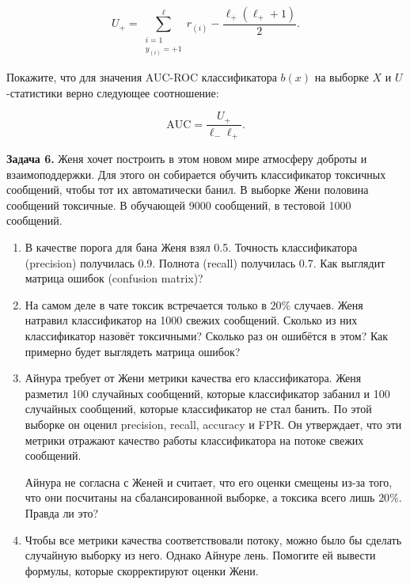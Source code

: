 \documentclass[12pt,fleqn]{article}
\begin{document}
$$
U_{+}=\sum_{\substack{i=1 \\ y_{(i)}=+1}}^{\ell} r_{(i)}-\frac{\ell_{+}\left(\ell_{+}+1\right)}{2}.
$$

Покажите, что для значения AUC-ROC классификатора $b(x)$ на выборке $X$ и $U$-статистики верно следующее соотношение:

$$
\mathrm{AUC}=\frac{U_{+}}{\ell_{-} \ell_{+}}.
$$

\textbf{Задача 6.} Женя хочет построить в этом новом мире атмосферу доброты и взаимоподдержки. Для этого он собирается обучить классификатор токсичных сообщений, чтобы тот их автоматически банил. В выборке Жени половина сообщений токсичные. В обучающей 9000 сообщений, в тестовой 1000 сообщений.

\begin{enumerate}
  \item В качестве порога для бана Женя взял 0.5. Точность классификатора (precision) получилась 0.9. Полнота (recall) получилась 0.7. Как выглядит матрица ошибок (confusion matrix)?
  \item На самом деле в чате токсик встречается только в $20 \%$ случаев. Женя натравил классификатор на 1000 свежих сообщений. Сколько из них классификатор назовёт токсичными? Сколько раз он ошибётся в этом? Как примерно будет выглядеть матрица ошибок?\\
  \item Айнура требует от Жени метрики качества его классификатора. Женя разметил 100 случайных сообщений, которые классификатор забанил и 100 случайных сообщений, которые классификатор не стал банить. По этой выборке он оценил precision, recall, accuracy и FPR. Он утверждает, что эти метрики отражают качество работы классификатора на потоке свежих сообщений.

Айнура не согласна с Женей и считает, что его оценки смещены из-за того, что они посчитаны на сбалансированной выборке, а токсика всего лишь $20 \%$. Правда ли это?\\
  \item Чтобы все метрики качества соответствовали потоку, можно было бы сделать случайную выборку из него. Однако Айнуре лень. Помогите ей вывести формулы, которые скорректируют оценки Жени.
\end{enumerate}
\end{document}
